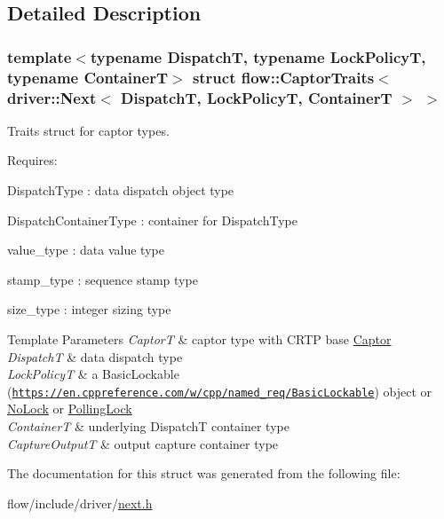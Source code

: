 \subsection{Detailed Description}
\subsubsection*{template$<$typename DispatchT, typename Lock\+PolicyT, typename ContainerT$>$\newline
struct flow\+::\+Captor\+Traits$<$ driver\+::\+Next$<$ Dispatch\+T, Lock\+Policy\+T, Container\+T $>$ $>$}

Traits struct for captor types. 

Requires\+:
\begin{DoxyItemize}
\item {\ttfamily Dispatch\+Type} \+: data dispatch object type
\item {\ttfamily Dispatch\+Container\+Type} \+: container for {\ttfamily Dispatch\+Type}
\item {\ttfamily value\+\_\+type} \+: data value type
\item {\ttfamily stamp\+\_\+type} \+: sequence stamp type
\item {\ttfamily size\+\_\+type} \+: integer sizing type
\end{DoxyItemize}


\begin{DoxyTemplParams}{Template Parameters}
{\em CaptorT} & captor type with C\+R\+TP base {\ttfamily \hyperlink{classflow_1_1_captor}{Captor}}\\
\hline
{\em DispatchT} & data dispatch type \\
\hline
{\em Lock\+PolicyT} & a Basic\+Lockable (\href{https://en.cppreference.com/w/cpp/named_req/BasicLockable}{\tt https\+://en.\+cppreference.\+com/w/cpp/named\+\_\+req/\+Basic\+Lockable}) object or \hyperlink{structflow_1_1_no_lock}{No\+Lock} or \hyperlink{structflow_1_1_polling_lock}{Polling\+Lock} \\
\hline
{\em ContainerT} & underlying {\ttfamily DispatchT} container type \\
\hline
{\em Capture\+OutputT} & output capture container type \\
\hline
\end{DoxyTemplParams}


The documentation for this struct was generated from the following file\+:\begin{DoxyCompactItemize}
\item 
flow/include/driver/\hyperlink{next_8h}{next.\+h}\end{DoxyCompactItemize}
